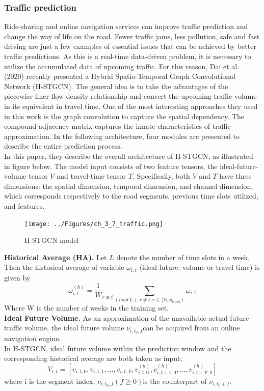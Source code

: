 \subsubsection{Traffic prediction}
Ride-sharing and online navigation services can improve traffic prediction and change the way of life on the road. Fewer traffic jams, less pollution, safe and fast driving are just a few examples of essential issues that can be achieved by better traffic predictions. As this is a real-time data-driven problem, it is necessary to utilize the accumulated data of upcoming traffic. For this reason, Dai et al. (2020) recently presented a Hybrid Spatio-Temporal Graph Convolutional Network (H-STGCN). The general idea is to take the advantages of the piecewise-liner-flow-density relationship and convert the upcoming traffic volume in its equivalent in travel time. One of the most interesting approaches they used in this work is the graph convolution to capture the spatial dependency. The compound adjacency matrix captures the innate characteristics of traffic approximation. In the following architecture, four modules are presented to describe the entire prediction process.\\
In this paper, they describe the overall architecture of H-STGCN, as illustrated in figure below. The model input consists of two feature tensors, the ideal-future-volume tensor $V$ and travel-time tensor $T$. Specifically, both $V$  and $T$ have three dimensions: the spatial dimension, temporal dimension, and channel dimension, which corresponds respectively to the road segments, previous time slots utilized, and features.

\begin{figure}[H]
    \texttt{[image: ../Figures/ch\_3\_7\_traffic.png]}
    \caption{H-STGCN model}
\end{figure}
 \textbf{Historical Average (HA).}  Let $L$ denote the number of time slots in a week. Then the historical average of variable $\omega_{i,t}$ (ideal future: volume or travel time) is given by
$$\omega_{i,t}^{\left(h\right)}={\frac{1}{W}}_{r\equiv t}\sum_{\left(mod\ L\right),r\neq t,r\in\left[0,S_{train}\right)}\omega_{i,t}$$
Where W is the number of weeks in the training set. \\
\textbf{Ideal Future Volume.} As an approximation of the unavailable actual future traffic volume, the ideal future volume $\nu_{i,t_0,f}$can be acquired from an online navigation engine.\\
In H-STGCN, ideal future volume within the prediction window and the corresponding historical average are both taken as input:
$$V_{i,t}=\left[v_{i,t,0},v_{i,t,1},\ldots,v_{i,t,F},v_{i,t,0}^{\left(h\right)},v_{i,t+1,0}^{\left(h\right)},\ldots,v_{i,t+F,0}^{\left(h\right)}\right]$$
where i is the segment index, $\nu_{i,t_0,f}\left(f\geq0\right) $is the counterpart of $\nu_{i,t_0+f}$. \\

